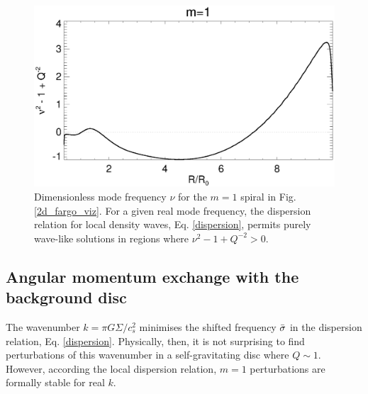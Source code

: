 \begin{figure}
  \includegraphics[width=\linewidth]{figures/m1_analysis_Qbar_fargo.ps} 
  \caption{Dimensionless mode frequency $\nu$ for the $m=1$ spiral in
    Fig. \ref{2d_fargo_viz}. For a given real mode frequency, the
    dispersion relation for local density waves, Eq. \ref{dispersion},
    permits purely wave-like solutions in regions where $\nu^2 - 1 +
    Q^{-2}>0$.    
    \label{fargo_qbarrier}} 
\end{figure}

\subsection{Angular momentum exchange with the background disc}  
The wavenumber $k = \pi G\Sigma/c_s^2$ minimises the shifted frequency
$\bar{\sigma}$ in the dispersion relation, Eq. \ref{dispersion}.  
Physically, then, it is not
surprising to find perturbations of this wavenumber in a
self-gravitating disc where $Q\sim 1$. However, according the
local dispersion relation, $m=1$ perturbations are
formally stable for real $k$.  

